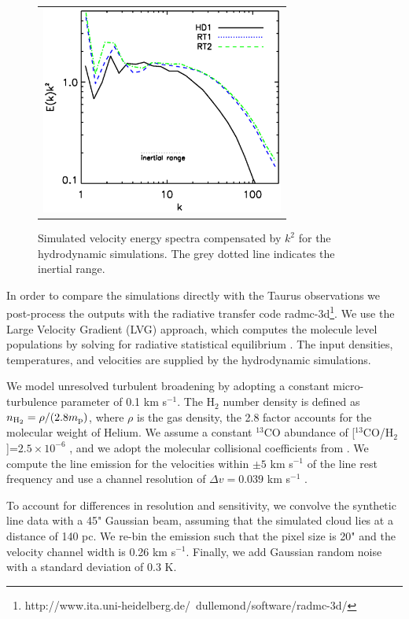\documentclass[iop,revtex4]{emulateapj}
\begin{document}
\begin{figure}[htbp]
\centering
\begin{tabular}{c}
\includegraphics[width=8cm]{power_sim.eps}\\
\end{tabular}
\caption{ Simulated velocity energy spectra compensated by $k^2$ for the hydrodynamic simulations. The grey dotted line indicates the inertial range. \label{powersim}}
\end{figure}

In order to compare the simulations directly with the Taurus observations we post-process the outputs with the radiative transfer code {\sc radmc-3d}\footnote{http://www.ita.uni-heidelberg.de/~dullemond/software/radmc-3d/}. We use the Large Velocity Gradient (LVG) approach, which computes the molecule level populations by solving for radiative statistical equilibrium \citep{shetty11}. The input densities, temperatures, and velocities are supplied by the hydrodynamic simulations.

We model unresolved turbulent broadening by adopting a constant micro-turbulence parameter of 0.1 km s$^{-1}$. The H$_2$ number density is defined as $n_{{\rm H}_2}=\rho/(2.8 m_{\rm p})$, where $\rho$ is the gas density, the 2.8 factor accounts for the molecular weight of Helium.  We assume a constant $^{13}$CO abundance of [$^{13}$CO/H$_2$]=$2.5 \times 10^{-6}$ \citep{Frerking1982,Langer1993}, and we adopt the molecular collisional coefficients from \citet{schoier05}. We compute the line emission for the velocities within $\pm5$ km s$^{-1}$ of the line rest frequency and use a channel resolution of $\Delta v=0.039$ km s$^{-1}$ .

To account for differences in resolution and sensitivity, we convolve the synthetic line data with a 45" Gaussian beam, assuming that the simulated cloud lies at a distance of 140 pc. We re-bin the emission such that the pixel size is 20" and the velocity channel width is 0.26 km s$^{-1}$. Finally, we add Gaussian random noise with a standard deviation of $0.3$ K.
\end{document}
